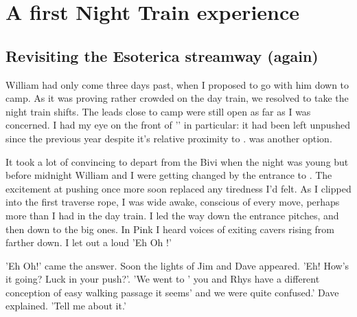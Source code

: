 \section{A first Night Train experience}
\begin{marginfigure}
\end{marginfigure}

\subsection{Revisiting the Esoterica streamway (again)}
William had only come three days past, when I proposed to go with him down to camp. As it was proving rather crowded on the day train, we resolved to take the night train shifts. The leads close to camp were still open as far as I was concerned. I had my eye on the front of '' in particular: it had been left unpushed since the previous year despite it's relative proximity to .  was another option. 

It took a lot of convincing to depart from the Bivi when the night was young but before midnight William and I were getting changed by the entrance to . The excitement at pushing once more soon replaced any tiredness I'd felt. As I clipped into the first traverse rope, I was wide awake, conscious of every move, perhaps more than I had in the day train. I led the way down the entrance pitches, and then down to the big ones. In Pink I heard voices of exiting cavers rising from farther down. I let out a loud 'Eh Oh !'

 'Eh Oh!' came the answer. Soon the lights of Jim and Dave appeared. 'Eh! How's it going? Luck in your push?'. 
'We went to '  you and Rhys have a different conception of easy walking passage it seems' and we were quite confused.' Dave explained.
'Tell me about it.'

